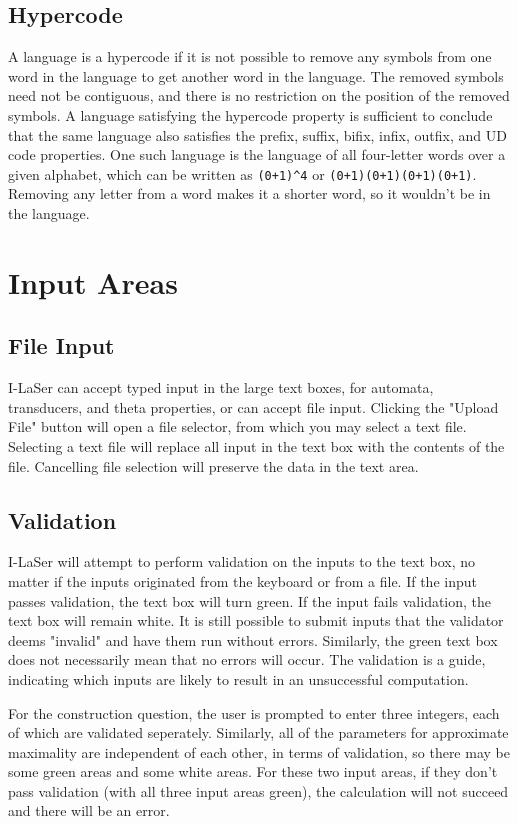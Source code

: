 \documentclass{article}
\begin{document}
\subsection{Hypercode}
A language is a hypercode if it is not possible to remove any symbols from one word in the language to get another word in the language. The removed symbols need not be contiguous, and there is no restriction on the position of the removed symbols. A language satisfying the hypercode property is sufficient to conclude that the same language also satisfies the prefix, suffix, bifix, infix, outfix, and UD code properties. One such language is the language of all four-letter words over a given alphabet, which can be written as \verb-(0+1)^4- or \verb-(0+1)(0+1)(0+1)(0+1)-. Removing any letter from a word makes it a shorter word, so it wouldn't be in the language. 

\section{Input Areas}

\subsection{File Input}
I-LaSer can accept typed input in the large text boxes, for automata, transducers, and theta properties, or can accept file input. Clicking the "Upload File" button will open a file selector, from which you may select a text file. Selecting a text file will replace all input in the text box with the contents of the file. Cancelling file selection will preserve the data in the text area.

\subsection{Validation}
I-LaSer will attempt to perform validation on the inputs to the text box, no matter if the inputs originated from the keyboard or from a file. If the input passes validation, the text box will turn green. If the input fails validation, the text box will remain white. It is still possible to submit inputs that the validator deems "invalid" and have them run without errors. Similarly, the green text box does not necessarily mean that no errors will occur. 
The validation is a guide, indicating which inputs are likely to result in an unsuccessful computation.
\par For the construction question, the user is prompted to enter three integers, each of which are validated seperately.
Similarly, all of the parameters for approximate maximality are independent of each other, in terms of validation, so there may be some green areas and some white areas.
For these two input areas, if they don't pass validation (with all three input areas green), the calculation will not succeed and there will be an error.
\end{document}

